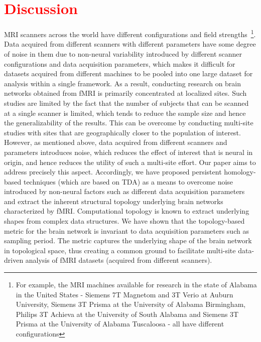 \section{\textcolor{red}{Discussion}}
\label{sec:discussion}

MRI scanners across the world have different configurations and field strengths~\footnote{For example, the MRI machines available for research in the state of Alabama in the United States - Siemens 7T Magnetom and 3T Verio at Auburn University, Siemens 3T Prisma at the University of Alabama  Birmingham, Philips 3T Achieva at the University of South Alabama and Siemens 3T Prisma at the University of Alabama Tuscaloosa - all have different configurations}. Data acquired from different scanners with different parameters have some degree of noise in them due to non-neural variability introduced by different scanner configurations and data acquisition parameters, which makes it difficult for datasets acquired from different machines to be pooled into one large dataset for analysis within a single framework. As a result, conducting research on brain networks obtained from fMRI is primarily concentrated at localized sites. Such studies are limited by the fact that the number of subjects that can be scanned at a single scanner is limited, which tends to reduce the sample size and hence the generalizability of the results. This can be overcome by conducting multi-site studies with sites that are geographically closer to the population of interest. However, as mentioned above, data acquired from different scanners and parameters introduces noise, which reduces the effect of interest that is neural in origin, and hence reduces the utility of such a multi-site effort. Our paper aims to address precisely this aspect. Accordingly, we have proposed persistent homology-based techniques (which are based on TDA) as a means to overcome noise introduced by non-neural factors such as different data acquisition parameters and extract the inherent structural topology underlying brain networks characterized by fMRI. Computational topology is known to extract underlying shapes from complex data structures. We have shown that the topology-based metric for the brain network is invariant to data acquisition parameters such as sampling period. The metric captures the underlying shape of the brain network in topological space, thus creating a common ground to facilitate multi-site data-driven analysis of fMRI datasets (acquired from different scanners).

